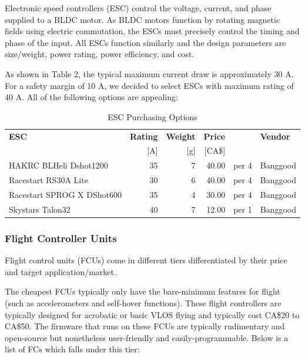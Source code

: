 Electronic speed controllers (ESC) control the voltage, current, and phase supplied to a BLDC motor. As BLDC motors function by rotating magnetic fields using electric commutation, the ESCs must precisely control the timing and phase of the input. All ESCs function similarly and the design parameters are size/weight, power rating, power efficiency, and cost.

As shown in Table 2, the typical maximum current draw is approximately 30 A. For a 
safety margin of 10 A, we decided to select ESCs with maximum rating of 40 A. All of the following options are appealing:

\begin{table}[h]
    \centering
    \caption{ESC Purchasing Options}
    \label{table:esc-table}

    \begin{tabular}{lrrrll}

    \hline
    \textbf{ESC} & \textbf{Rating} & \textbf{Weight} & \textbf{Price}  & & \textbf{Vendor}\\
    & [A] & [g] & [CA\$] & & \\
    \hline
    HAKRC BLHeli Dshot1200 & 35 & 7  & 40.00 & per 4 & Banggood\\
    Racestart RS30A Lite & 30 & 6  & 40.00 & per 4 & Banggood\\
    Racestart SPROG X DShot600 & 35 & 4  & 30.00 & per 4 & Banggood\\
    Skystars Talon32 & 40 & 7  & 12.00 & per 1 & Banggood\\
    \hline

    \end{tabular} 
\end{table}

\subsubsection{Flight Controller Units}

Flight control units (FCUs) come in different tiers differentiated by their price and target application/market. 

The cheapest FCUs typically only have the bare-minimum features for flight (such as accelerometers and self-hover functions). These flight controllers are typically designed for acrobatic or basic VLOS flying and typically cost CA\$20 to CA\$50. The firmware that runs on these FCUs are typically rudimentary and open-source but nonetheless user-friendly and easily-programmable. Below is a list of FCs which falls under this tier:

